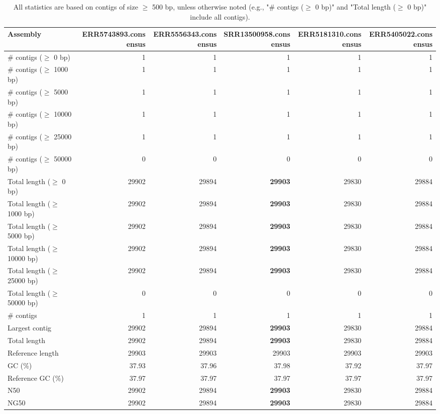 \documentclass[12pt,a4paper]{article}
\begin{document}
\begin{table}[ht]
\begin{center}
\caption{All statistics are based on contigs of size $\geq$ 500 bp, unless otherwise noted (e.g., "\# contigs ($\geq$ 0 bp)" and "Total length ($\geq$ 0 bp)" include all contigs).}
\begin{tabular}{|l*{5}{|r}|}
\hline
Assembly & ERR5743893.consensus & ERR5556343.consensus & SRR13500958.consensus & ERR5181310.consensus & ERR5405022.consensus \\ \hline
\# contigs ($\geq$ 0 bp) & 1 & 1 & 1 & 1 & 1 \\ \hline
\# contigs ($\geq$ 1000 bp) & 1 & 1 & 1 & 1 & 1 \\ \hline
\# contigs ($\geq$ 5000 bp) & 1 & 1 & 1 & 1 & 1 \\ \hline
\# contigs ($\geq$ 10000 bp) & 1 & 1 & 1 & 1 & 1 \\ \hline
\# contigs ($\geq$ 25000 bp) & 1 & 1 & 1 & 1 & 1 \\ \hline
\# contigs ($\geq$ 50000 bp) & 0 & 0 & 0 & 0 & 0 \\ \hline
Total length ($\geq$ 0 bp) & 29902 & 29894 & {\bf 29903} & 29830 & 29884 \\ \hline
Total length ($\geq$ 1000 bp) & 29902 & 29894 & {\bf 29903} & 29830 & 29884 \\ \hline
Total length ($\geq$ 5000 bp) & 29902 & 29894 & {\bf 29903} & 29830 & 29884 \\ \hline
Total length ($\geq$ 10000 bp) & 29902 & 29894 & {\bf 29903} & 29830 & 29884 \\ \hline
Total length ($\geq$ 25000 bp) & 29902 & 29894 & {\bf 29903} & 29830 & 29884 \\ \hline
Total length ($\geq$ 50000 bp) & 0 & 0 & 0 & 0 & 0 \\ \hline
\# contigs & 1 & 1 & 1 & 1 & 1 \\ \hline
Largest contig & 29902 & 29894 & {\bf 29903} & 29830 & 29884 \\ \hline
Total length & 29902 & 29894 & {\bf 29903} & 29830 & 29884 \\ \hline
Reference length & 29903 & 29903 & 29903 & 29903 & 29903 \\ \hline
GC (\%) & 37.93 & 37.96 & 37.98 & 37.92 & 37.97 \\ \hline
Reference GC (\%) & 37.97 & 37.97 & 37.97 & 37.97 & 37.97 \\ \hline
N50 & 29902 & 29894 & {\bf 29903} & 29830 & 29884 \\ \hline
NG50 & 29902 & 29894 & {\bf 29903} & 29830 & 29884 \\ \hline

\end{tabular}
\end{center}
\end{table}
\end{document}
